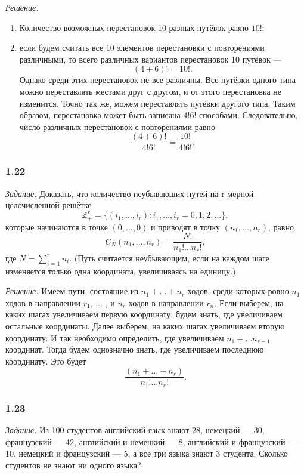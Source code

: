 \textit{Решение.}
\begin{enumerate}[label=\alph*)]
\item Количество возможных перестановок 10 разных путёвок равно $10!$;

\item если будем считать все 10 элементов перестановки с повторениями различными, то всего различных вариантов перестановок 10 путёвок ---
$$ ( 4 + 6 )! = 10!.$$
Однако среди этих перестановок не все различны.
Все путёвки одного типа можно переставлять местами друг с другом, и от этого перестановка не изменится.
Точно так же, можем переставлять путёвки другого типа.
Таким образом, перестановка может быть записана $4!6!$ способами.
Следовательно, число различных перестановок с повторениями равно
$$ \frac{ ( 4 + 6 )! }{ 4!6! } = \frac{10!}{4!6!}.$$
\end{enumerate}

\subsubsection*{1.22}

\textit{Задание.} Доказать, что количество неубывающих путей на r-мерной целочисленной решётке
$$ \mathbb{Z}_+^r = \{ \left( i_1,  \dotsc , i_r \right) : i_1,  \dotsc , i_r = 0, 1, 2,  \dotsc \} ,$$
которые начинаются в точке $ \left( 0,  \dotsc , 0 \right) $ и приводят в точку $ \left( n_1,  \dotsc , n_r \right) $, равно
$$ C_N \left( n_1,  \dotsc , n_r \right) =
\frac{N!}{n_1! \dotsc n_r!},$$
где $ N = \sum \limits_{ i = 1 }^r n_i$.
(Путь считается неубывающим, если на каждом шаге изменяется только одна координата, увеличиваясь на единицу.)

\textit{Решение.} Имеем пути, состоящие из $ n_1 + \dotsc + n_r$ ходов,
среди которых ровно $n_1$ ходов в направлении $ r_1$,  $\dotsc$ , и $n_r$ ходов в направлении $r_n$.
Если выберем, на каких шагах увеличиваем первую координату, будем знать, где увеличиваем остальные координаты.
Далее выберем, на каких шагах увеличиваем вторую координату.
И так необходимо определить, где увеличиваем $ n_1+ \dotsc n_{r-1}$ координат.
Тогда будем однозначно знать, где увеличиваем последнюю координату.
Это будет
$$ \frac{ \left( n_1 + \dotsc + n_r \right) }{ n_1! \dotsc n_r! }.$$

\subsubsection*{1.23}

\textit{Задание.} Из 100 студентов английский язык знают 28,
немецкий --- 30, французский --- 42, английский и немецкий --- 8, английский и французский --- 10, немецкий и французский --- 5, а все три языка знают 3 студента.
Сколько студентов не знают ни одного языка?

